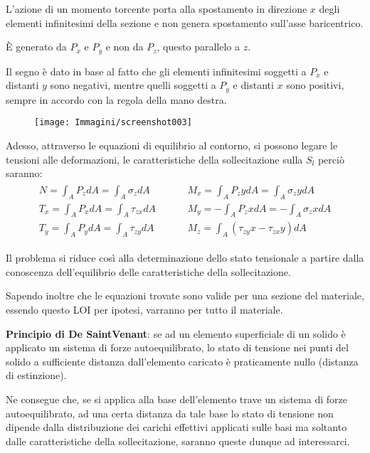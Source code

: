 \documentclass{article}
\begin{document}
\begin{adjustwidth}{2in}{}
	L'azione di un momento torcente porta alla spostamento in direzione $x$ degli elementi infinitesimi della sezione e non genera spostamento sull'asse baricentrico. 

	È generato da $P_x$ e $P_y$ e non da $P_z$, questo parallelo a $z$. 

	Il segno è dato in base al fatto che gli elementi infinitesimi soggetti a $P_x$ e distanti $y$ sono negativi, mentre quelli soggetti a $P_y$ e distanti $x$ sono positivi, sempre in accordo con la regola della mano destra. 
\begin{figure}[H]
	\centering
	\texttt{[image: Immagini/screenshot003]}
	\label{fig:screenshot003}
\end{figure}

	Adesso, attraverso le equazioni di equilibrio al contorno, si possono legare le tensioni alle deformazioni, le caratteristiche della sollecitazione sulla $S_l$ perciò saranno:
\[\begin{matrix}
	\begin{aligned}
		N = \int_A P_zdA = \int_A \sigma_zdA  \hspace{1cm} & M_x = \int_A P_zydA = \int_A \sigma_zydA  \\
		T_x = \int_A P_xdA = \int_A \tau_{zx}dA \hspace{1cm} &  M_y = -\int_A P_zxdA = -\int_A \sigma_zxdA \\
		T_y = \int_A P_ydA = \int_A \tau_{zy}dA \hspace{1cm} &  M_z = \int_A (\tau_{zy}x -\tau_{zx}y)dA
	\end{aligned}	
\end{matrix}\]
	

	Il problema si riduce così alla determinazione dello stato tensionale a partire dalla conoscenza dell'equilibrio delle caratteristiche della sollecitazione. 

	Sapendo inoltre che le equazioni trovate sono valide per una sezione del materiale, essendo questo LOI per ipotesi, varranno per tutto il materiale. \newline

	\textbf{Principio di De SaintVenant}: se ad un elemento superficiale di un solido è applicato un sistema di forze autoequilibrato, lo stato di tensione nei punti del solido a sufficiente distanza dall’elemento caricato è praticamente nullo (distanza di estinzione). \newline 
	
	Ne consegue che, se si applica alla base dell'elemento trave un sistema di forze autoequilibrato, ad una certa distanza da tale base lo stato di tensione non dipende dalla
	distribuzione dei carichi effettivi applicati sulle basi ma soltanto dalle caratteristiche della sollecitazione, saranno queste dunque ad interessarci. \newline
	

\end{adjustwidth}
\end{document}
